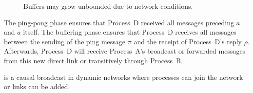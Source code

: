 \begin{figure*}
  \begin{center}
    \hspace{20pt}
    \hspace{20pt}
    \caption{\label{fig:bufferproblem}Buffers may grow unbounded due to network
      conditions.}
  \end{center}
\end{figure*}



The ping-pong phase ensures that Process~D received all messages preceding
$a$ and $a$ itself. The buffering phase ensures that Process~D receives all
messages between the sending of the ping message $\pi$ and the receipt of
Process~D's reply $\rho$. Afterwards, Process~D will receive
Process~A's broadcast or forwarded messages from this new direct link or
transitively through Process~B.

\begin{lemma}
  \CBROADCAST is a causal broadcast in dynamic networks where processes can join
  the network or links can be added.
\end{lemma}

